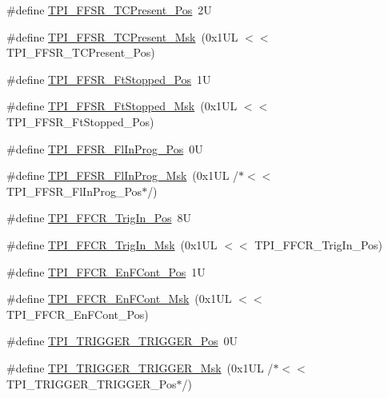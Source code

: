 \begin{DoxyCompactItemize}
\item 
\#define \mbox{\hyperlink{group___c_m_s_i_s___t_p_i_gad30fde0c058da2ffb2b0a213be7a1b5c}{T\+P\+I\+\_\+\+F\+F\+S\+R\+\_\+\+T\+C\+Present\+\_\+\+Pos}}~2U
\item 
\#define \mbox{\hyperlink{group___c_m_s_i_s___t_p_i_ga0d6bfd263ff2fdec72d6ec9415fb1135}{T\+P\+I\+\_\+\+F\+F\+S\+R\+\_\+\+T\+C\+Present\+\_\+\+Msk}}~(0x1\+U\+L $<$$<$ T\+P\+I\+\_\+\+F\+F\+S\+R\+\_\+\+T\+C\+Present\+\_\+\+Pos)
\item 
\#define \mbox{\hyperlink{group___c_m_s_i_s___t_p_i_gaedf31fd453a878021b542b644e2869d2}{T\+P\+I\+\_\+\+F\+F\+S\+R\+\_\+\+Ft\+Stopped\+\_\+\+Pos}}~1U
\item 
\#define \mbox{\hyperlink{group___c_m_s_i_s___t_p_i_ga1ab6c3abe1cf6311ee07e7c479ce5f78}{T\+P\+I\+\_\+\+F\+F\+S\+R\+\_\+\+Ft\+Stopped\+\_\+\+Msk}}~(0x1\+U\+L $<$$<$ T\+P\+I\+\_\+\+F\+F\+S\+R\+\_\+\+Ft\+Stopped\+\_\+\+Pos)
\item 
\#define \mbox{\hyperlink{group___c_m_s_i_s___t_p_i_ga542ca74a081588273e6d5275ba5da6bf}{T\+P\+I\+\_\+\+F\+F\+S\+R\+\_\+\+Fl\+In\+Prog\+\_\+\+Pos}}~0U
\item 
\#define \mbox{\hyperlink{group___c_m_s_i_s___t_p_i_ga63dfb09259893958962914fc3a9e3824}{T\+P\+I\+\_\+\+F\+F\+S\+R\+\_\+\+Fl\+In\+Prog\+\_\+\+Msk}}~(0x1\+U\+L /$\ast$$<$$<$ T\+P\+I\+\_\+\+F\+F\+S\+R\+\_\+\+Fl\+In\+Prog\+\_\+\+Pos$\ast$/)
\item 
\#define \mbox{\hyperlink{group___c_m_s_i_s___t_p_i_gaa7ea11ba6ea75b541cd82e185c725b5b}{T\+P\+I\+\_\+\+F\+F\+C\+R\+\_\+\+Trig\+In\+\_\+\+Pos}}~8U
\item 
\#define \mbox{\hyperlink{group___c_m_s_i_s___t_p_i_ga360b413bc5da61f751546a7133c3e4dd}{T\+P\+I\+\_\+\+F\+F\+C\+R\+\_\+\+Trig\+In\+\_\+\+Msk}}~(0x1\+U\+L $<$$<$ T\+P\+I\+\_\+\+F\+F\+C\+R\+\_\+\+Trig\+In\+\_\+\+Pos)
\item 
\#define \mbox{\hyperlink{group___c_m_s_i_s___t_p_i_ga99e58a0960b275a773b245e2b69b9a64}{T\+P\+I\+\_\+\+F\+F\+C\+R\+\_\+\+En\+F\+Cont\+\_\+\+Pos}}~1U
\item 
\#define \mbox{\hyperlink{group___c_m_s_i_s___t_p_i_ga27d1ecf2e0ff496df03457a2a97cb2c9}{T\+P\+I\+\_\+\+F\+F\+C\+R\+\_\+\+En\+F\+Cont\+\_\+\+Msk}}~(0x1\+U\+L $<$$<$ T\+P\+I\+\_\+\+F\+F\+C\+R\+\_\+\+En\+F\+Cont\+\_\+\+Pos)
\item 
\#define \mbox{\hyperlink{group___c_m_s_i_s___t_p_i_ga5517fa2ced64efbbd413720329c50b99}{T\+P\+I\+\_\+\+T\+R\+I\+G\+G\+E\+R\+\_\+\+T\+R\+I\+G\+G\+E\+R\+\_\+\+Pos}}~0U
\item 
\#define \mbox{\hyperlink{group___c_m_s_i_s___t_p_i_ga814227af2b2665a0687bb49345e21110}{T\+P\+I\+\_\+\+T\+R\+I\+G\+G\+E\+R\+\_\+\+T\+R\+I\+G\+G\+E\+R\+\_\+\+Msk}}~(0x1\+U\+L /$\ast$$<$$<$ T\+P\+I\+\_\+\+T\+R\+I\+G\+G\+E\+R\+\_\+\+T\+R\+I\+G\+G\+E\+R\+\_\+\+Pos$\ast$/)

\end{DoxyCompactItemize}
